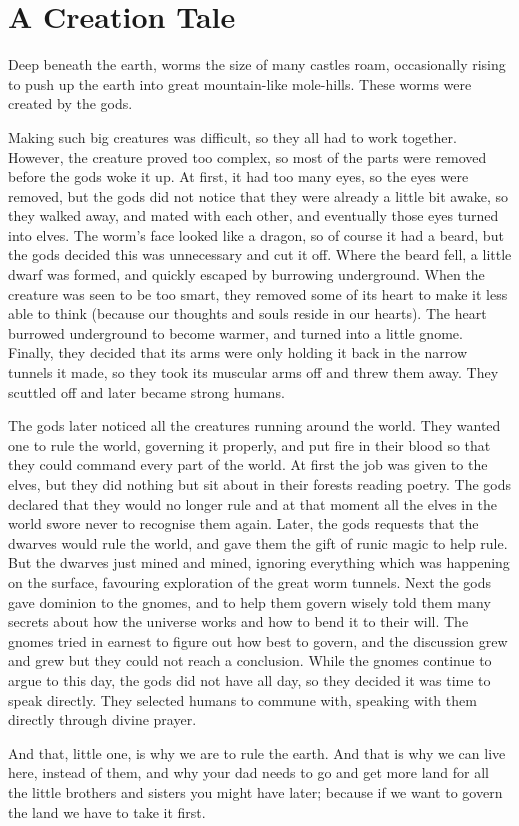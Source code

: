 \chapter{A Creation Tale}

\begin{multicols}{2}

Deep beneath the earth, worms the size of many castles roam, occasionally rising to push up the earth into great mountain-like mole-hills.  These worms were created by the gods.

	Making such big creatures was difficult, so they all had to work together.  However, the creature proved too complex, so most of the parts were removed before the gods woke it up.  At first, it had too many eyes, so the eyes were removed, but the gods did not notice that they were already a little bit awake, so they walked away, and mated with each other, and eventually those eyes turned into elves.  The worm's face looked like a dragon, so of course it had a beard, but the gods decided this was unnecessary and cut it off.  Where the beard fell, a little dwarf was formed, and quickly escaped by burrowing underground.  When the creature was seen to be too smart, they removed some of its heart to make it less able to think (because our thoughts and souls reside in our hearts).  The heart burrowed underground to become warmer, and turned into a little gnome.  Finally, they decided that its arms were only holding it back in the narrow tunnels it made, so they took its muscular arms off and threw them away.  They scuttled off and later became strong humans.

	The gods later noticed all the creatures running around the world.  They wanted one to rule the world, governing it properly, and put fire in their blood so that they could command every part of the world.  At first the job was given to the elves, but they did nothing but sit about in their forests reading poetry.  The gods declared that they would no longer rule and at that moment all the elves in the world swore never to recognise them again.  Later, the gods requests that the dwarves would rule the world, and gave them the gift of runic magic to help rule.  But the dwarves just mined and mined, ignoring everything which was happening on the surface, favouring exploration of the great worm tunnels.  Next the gods gave dominion to the gnomes, and to help them govern wisely told them many secrets about how the universe works and how to bend it to their will.  The gnomes tried in earnest to figure out how best to govern, and the discussion grew and grew but they could not reach a conclusion.  While the gnomes continue to argue to this day, the gods did not have all day, so they decided it was time to speak directly.  They selected humans to commune with, speaking with them directly through divine prayer.

	And that, little one, is why we are to rule the earth.  And that is why we can live here, instead of them, and why your dad needs to go and get more land for all the little brothers and sisters you might have later; because if we want to govern the land we have to take it first.

\end{multicols}

